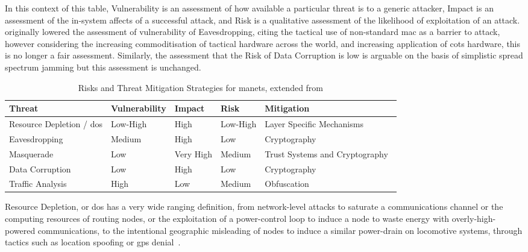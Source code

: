 In this context of this table, Vulnerability is an assessment of how available a particular threat is to a generic attacker, Impact is an assessment of the in-system affects of a successful attack, and Risk is a qualitative assessment of the likelihood of exploitation of an attack.
\citet{Kidston2010} originally lowered the assessment of vulnerability of Eavesdropping, citing the tactical use of non-standard \gls{mac} as a barrier to attack, however considering the increasing commoditisation of tactical hardware across the world, and increasing application of \gls{cots} hardware, this is no longer a fair assessment.
Similarly, the assessment that the Risk of Data Corruption is low is arguable on the basis of simplistic spread spectrum jamming but this assessment is unchanged.

\begin{table}
	\caption{Risks and Threat Mitigation Strategies for \glspl{manet}, extended from \cite{Kidston2010}}
	\label{tab:manet_risk}
	\begin{tabularx}{\textwidth}{p{4cm} X X X >{\raggedright\arraybackslash}p{4cm}}\toprule
		Threat & Vulnerability & Impact & Risk & Mitigation	\\\midrule
		Resource Depletion / \gls{dos} & Low-High & High & Low-High & Layer Specific Mechanisms~\cite{Wu2007,Nwaocha2015}\\
		Eavesdropping & Medium & High & Low & Cryptography~\cite{Chen2010}\\
		Masquerade & Low & Very High & Medium & Trust Systems and Cryptography~\cite{Wang2009a}\\
		Data Corruption & Low & High & Low & Cryptography\\
		Traffic Analysis & High & Low & Medium & Obfuscation~\cite{Huang2010}\\
	\end{tabularx}
\end{table}

Resource Depletion, or \gls{dos} has a very wide ranging definition, from network-level attacks to saturate a communications channel or the computing resources of routing nodes, or the exploitation of a power-control loop to induce a node to waste energy with overly-high-powered communications, to the intentional geographic misleading of nodes to induce a similar power-drain on locomotive systems, through tactics such as location spoofing or \gls{gps} denial~\cite{Zuba2015}.

